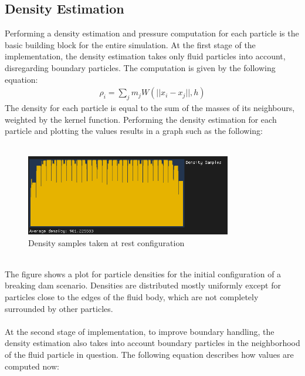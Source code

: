 \documentclass{ACGSeminar}
\begin{document}
\subsection{Density Estimation}
Performing a density estimation and pressure computation for each particle is the basic building block for the entire simulation.
At the first stage of the implementation, the density estimation takes only fluid particles into account, disregarding boundary particles. The computation is given by the following equation:\\
\begin{equation} 
\begin{aligned}
\rho_i = \sum_j m_j W(||x_i - x_j||,h) 
\end{aligned}
\end{equation}
The density for each particle is equal to the sum of the masses of its neighbours, weighted by the kernel function. Performing the density estimation for each particle and plotting the values results in a graph such as the following:\\
\\
\begin{figure}[b!]
  \begin{centering}
    \includegraphics[width=9cm]{figures/Kernel.png}\par
  \end{centering}
  \caption{Density samples taken at rest configuration}
  \label{fig:eulerLagrangian}
\end{figure}
\\
The figure shows a plot for particle densities for the initial configuration of a breaking dam scenario.
Densities are distributed mostly uniformly except for particles close to the edges of the fluid body, which are not completely surrounded by other particles.\\
\\
At the second stage of implementation, to improve boundary handling, the density estimation also takes into account boundary particles in the neighborhood of the fluid particle in question. The following equation describes how values are computed now:\\
\end{document}
